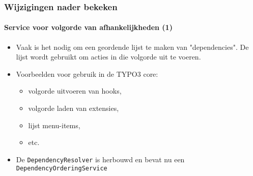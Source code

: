 \begin{frame}[fragile]
	\frametitle{Wijzigingen nader bekeken}
	\framesubtitle{Service voor volgorde van afhankelijkheden (1)}

	\begin{itemize}

		\item Vaak is het nodig om een geordende lijst te maken van "dependencies".
			De lijst wordt gebruikt om acties in die volgorde uit te voeren.

		\item Voorbeelden voor gebruik in de TYPO3 core:

			\begin{itemize}
				\item volgorde uitvoeren van hooks,
				\item volgorde laden van extensies,
				\item lijst menu-items,
				\item etc.
			\end{itemize}

		\item De \texttt{DependencyResolver} is herbouwd en bevat nu een
			\texttt{DependencyOrderingService}

	\end{itemize}

\end{frame}


